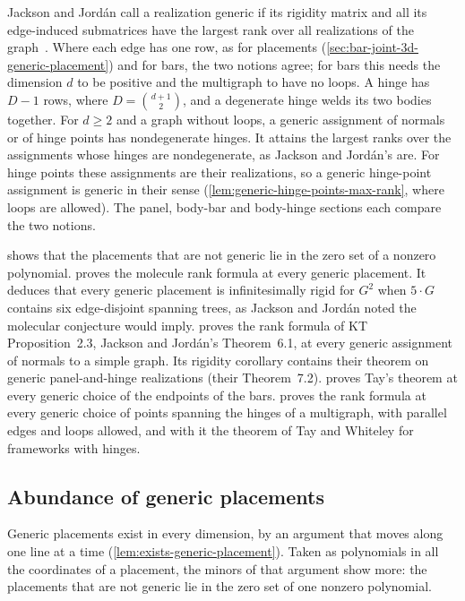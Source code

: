Jackson and Jord\'an call a realization generic if its rigidity matrix
and all its edge-induced submatrices have the largest rank over all
realizations of the graph~\cite[\S\S5--7]{jacksonJordan2009}. Where
each edge has one row, as for placements
(\cref{sec:bar-joint-3d-generic-placement}) and for bars, the two
notions agree; for bars this needs the dimension $d$ to be positive and
the multigraph to have no loops. A hinge has $D - 1$ rows, where
$D = \binom{d+1}{2}$, and a degenerate hinge welds its two bodies
together. For $d \ge 2$ and a graph without loops, a generic assignment
of normals or of hinge points has nondegenerate hinges. It attains the
largest ranks over the assignments whose hinges are nondegenerate, as
Jackson and Jord\'an's are. For hinge points these assignments are
their realizations, so a generic hinge-point assignment is generic in
their sense (\cref{lem:generic-hinge-points-max-rank}, where loops are
allowed). The panel, body-bar and body-hinge sections each compare
the two notions.

 shows that the placements that are
not generic lie in the zero set of a nonzero polynomial.
 proves the molecule rank formula at
every generic placement. It deduces that every generic placement is
infinitesimally rigid for $G^2$ when $5 \cdot G$ contains six
edge-disjoint spanning trees, as Jackson and Jord\'an noted the
molecular conjecture would imply.  proves
the rank formula of KT Proposition~2.3, Jackson and Jord\'an's
Theorem~6.1, at every generic assignment of normals to a simple graph.
Its rigidity corollary contains their theorem on generic
panel-and-hinge realizations (their Theorem~7.2).
 proves Tay's theorem at every generic
choice of the endpoints of the bars. 
proves the rank formula at every generic choice of points spanning the
hinges of a multigraph, with parallel edges and loops allowed, and with it the theorem of Tay and Whiteley
for frameworks with hinges.

\subsection{Abundance of generic placements}
\label{sec:generic-lift-abundance}

Generic placements exist in every dimension, by an argument that moves
along one line at a time (\cref{lem:exists-generic-placement}). Taken
as polynomials in all the coordinates of a placement, the minors of
that argument show more: the placements that are not generic lie in
the zero set of one nonzero polynomial.

